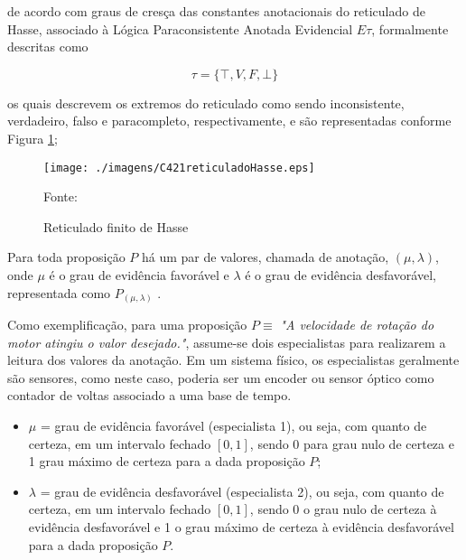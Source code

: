 de acordo com graus de cresça das constantes anotacionais do reticulado de Hasse, 
associado à Lógica Paraconsistente Anotada Evidencial $E\tau$, 
formalmente descritas como 

\begin{center}
\begin{equation}
  \tau = \{ \top , V, F, \bot \}
\end{equation}
\end{center}

os quais descrevem os extremos do reticulado como sendo 
inconsistente,%
verdadeiro, %
falso e %
paracompleto,%
respectivamente, e são representadas conforme Figura \ref{fig:reticuladoHasse}; 

\begin{figure}[!htb]
\caption{Reticulado finito de Hasse}
\center\texttt{[image: ./imagens/C421reticuladoHasse.eps]}
\label{fig:reticuladoHasse}

{\small Fonte: \cite{JoaoInacio} }
\end{figure}

Para toda proposição $P$ há um par de valores, chamada de anotação, $(\mu , \lambda )$, onde $\mu$ é o grau de evidência favorável e $\lambda $ é o grau de evidência desfavorável, representada como  $P_{( \mu , \lambda )}$ .

Como exemplificação, para uma proposição $P \equiv$ \emph{"A velocidade de rotação do motor atingiu o valor desejado."}, assume-se dois especialistas para realizarem a leitura dos valores da anotação. Em um sistema físico, os especialistas geralmente são sensores, como neste caso, poderia ser um encoder ou sensor óptico como contador de voltas associado a uma base de tempo.

\begin{itemize}
\item 
$\mu$ = grau de evidência favorável (especialista 1), ou seja, com quanto de certeza, em um intervalo fechado $[0,1]$, sendo 0 para grau nulo de certeza e 1 grau máximo de certeza para a dada proposição $P$;

\item
$\lambda$ = grau de evidência desfavorável (especialista 2), ou seja, com quanto de certeza, em um intervalo fechado $[0,1]$, sendo 0 o grau nulo de certeza à evidência desfavorável e 1 o grau máximo de certeza à evidência desfavorável para a dada proposição $P$.

\end{itemize}


